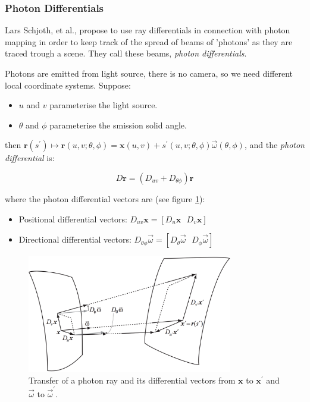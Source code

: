 \subsubsection{Photon Differentials}
Lars Schjoth, et al., propose to use ray differentials in connection with photon mapping in order to keep track of the spread of beams of 'photons' as they are traced trough a scene. They call these beams, \textit{photon differentials}\cite[10mm]{a:PhotonDifferentials}.

Photons are emitted from light source, there is no camera, so we need different local coordinate systems. Suppose:

\begin{itemize}
	\item $u$ and $v$ parameterise the light source.
	\item $\theta$ and $\phi$ parameterise the smission solid angle.
\end{itemize}

then $\mathbf{r}(s^{'})\mapsto\mathbf{r}(u,v;\theta,\phi)=\mathbf{x}(u,v)+s^{'}(u,v;\theta,\phi)\vec{\omega}(\theta,\phi)$, and the \textit{photon differential} is:

\begin{equation*}
	D\mathbf{r}=(D_{uv}+D_{\theta\phi})\mathbf{r}
\end{equation*}

where the photon differential vectors are (see figure \ref{f:first-order-photon-differentials}):

\begin{itemize}
	\item Positional differential vectors: $D_{uv}\mathbf{x}=[D_u\mathbf{x} \text{ }D_v\mathbf{x}]$
	\item Directional differential vectors: $D_{\theta\phi}\vec{\omega}=[D_{\theta}\vec{\omega}\text{ }D_{\phi}\vec{\omega}]$
\end{itemize}

\begin{figure}\label{f:first-order-photon-differentials}
\begin{center}
	\includegraphics[width=0.8\textwidth]{graphics/pm/pm-13-3}
\end{center}
	\caption{Transfer of a photon ray and its differential vectors from $\mathbf{x}$ to $\mathbf{x}^{'}$ and $\vec{\omega}$ to $\vec{\omega}^{'}$.}
\end{figure}

